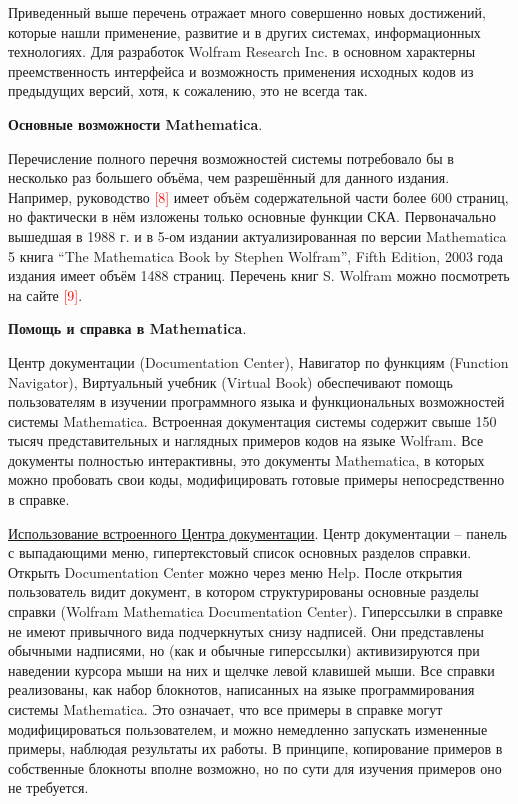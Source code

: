 Приведенный выше перечень отражает много совершенно новых достижений, которые нашли применение, развитие и в других системах, информационных технологиях. Для разработок Wolfram Research Inc. в основном характерны преемственность интерфейса и возможность применения исходных кодов из предыдущих версий, хотя, к сожалению, это не всегда так. 

\textbf{Основные возможности Mathematica}.

Перечисление полного перечня возможностей системы потребовало бы в несколько раз большего объёма, чем разрешённый для данного издания. Например, руководство \textcolor{red}{[8]} имеет объём содержательной части более 600 страниц, но фактически в нём изложены только основные функции СКА. 
Первоначально вышедшая в 1988 г. и в 5-ом издании актуализированная по версии Mathematica 5 книга “The Mathematica Book by Stephen Wolfram”, Fifth Edition, 2003 года издания имеет объём 1488 страниц. Перечень книг S. Wolfram можно посмотреть на сайте \textcolor{red}{[9]}.

\textbf{Помощь и справка в Mathematica}.

Центр документации (Documentation Center), Навигатор по функциям (Function Navigator), Виртуальный учебник (Virtual Book) обеспечивают помощь пользователям в изучении программного языка и функциональных возможностей системы Mathematica.
Встроенная документация системы содержит свыше 150 тысяч представительных и наглядных примеров кодов на языке Wolfram. Все документы полностью интерактивны, это документы Mathematica, в которых можно пробовать свои коды, модифицировать готовые примеры непосредственно в справке.

\underline{Использование встроенного Центра документации}. Центр документации -- панель с выпадающими меню, гипертекстовый список основных разделов справки. Открыть Documentation Center можно через меню Help. После открытия пользователь видит документ, в котором структурированы основные разделы справки (Wolfram Mathematica Documentation Center). 
Гиперссылки в справке не имеют привычного вида подчеркнутых снизу надписей. Они представлены обычными надписями, но (как и обычные гиперссылки) активизируются при наведении курсора мыши на них и щелчке левой клавишей мыши. 
Все справки реализованы, как набор блокнотов, написанных на языке программирования системы Mathematica. Это означает, что все примеры в справке могут модифицироваться пользователем, и можно немедленно запускать измененные примеры, наблюдая результаты их работы. В принципе, копирование примеров в собственные блокноты вполне возможно, но по сути для изучения примеров оно не требуется.

